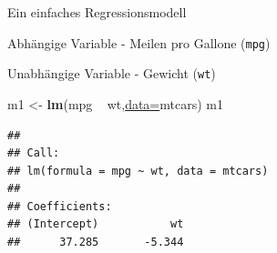 \documentclass[
  ignorenonframetext,
]{beamer}
\newenvironment{Shaded}{\begin{snugshade}}{\end{snugshade}}
\newcommand{\DataTypeTok}[1]{\textcolor[rgb]{0.74,0.68,0.62}{\underline{#1}}}
\newcommand{\KeywordTok}[1]{\textcolor[rgb]{0.26,0.66,0.93}{\textbf{#1}}}
\newcommand{\NormalTok}[1]{\textcolor[rgb]{0.74,0.68,0.62}{#1}}
\newcommand{\OperatorTok}[1]{\textcolor[rgb]{0.74,0.68,0.62}{#1}}
\newcommand{\StringTok}[1]{\textcolor[rgb]{0.02,0.61,0.04}{#1}}
\begin{document}
\begin{frame}[fragile]{Ein einfaches Regressionsmodell}
\protect\hypertarget{ein-einfaches-regressionsmodell}{}

\begin{block}{Abhängige Variable - Meilen pro Gallone (\texttt{mpg})}

\end{block}

\begin{block}{Unabhängige Variable - Gewicht (\texttt{wt})}

\begin{Shaded}
\begin{Highlighting}[]
\NormalTok{m1 <-}\StringTok{ }\KeywordTok{lm}\NormalTok{(mpg }\OperatorTok{~}\StringTok{ }\NormalTok{wt,}\DataTypeTok{data=}\NormalTok{mtcars)}
\NormalTok{m1}
\end{Highlighting}
\end{Shaded}

\begin{verbatim}
## 
## Call:
## lm(formula = mpg ~ wt, data = mtcars)
## 
## Coefficients:
## (Intercept)           wt  
##      37.285       -5.344
\end{verbatim}

\end{block}

\end{frame}
\end{document}
